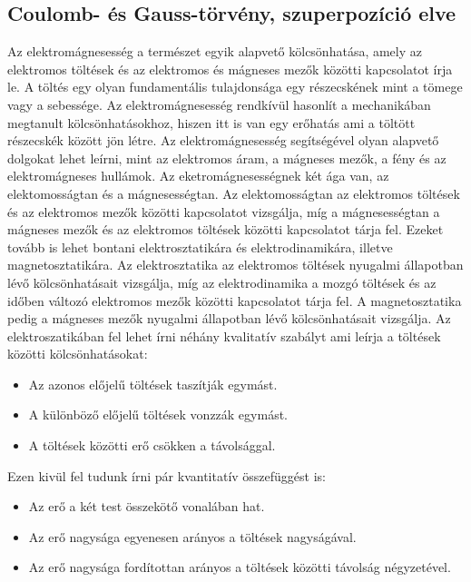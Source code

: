 \documentclass[a4paper,12pt]{article}
\begin{document}
\subsection{Coulomb- és Gauss-törvény, szuperpozíció elve}
Az elektromágnesesség a természet egyik alapvető kölcsönhatása, amely az elektromos töltések és az elektromos és mágneses mezők közötti kapcsolatot írja le.
A töltés egy olyan fundamentális tulajdonsága egy részecskének mint a tömege vagy a sebessége. Az elektromágnesesség rendkívül hasonlít a mechanikában megtanult
kölcsönhatásokhoz, hiszen itt is van egy erőhatás ami a töltött részecskék között jön létre. Az elektromágnesesség segítségével olyan alapvető dolgokat lehet leírni,
mint az elektromos áram, a mágneses mezők, a fény és az elektromágneses hullámok.
\newline
\newline
Az eketromágnesességnek két ága van, az elektomosságtan és a mágnesességtan. Az elektomosságtan az elektromos töltések és az elektromos mezők közötti kapcsolatot vizsgálja,
míg a mágnesességtan a mágneses mezők és az elektromos töltések közötti kapcsolatot tárja fel. Ezeket tovább is lehet bontani elektrosztatikára és elektrodinamikára,
illetve magnetosztatikára. Az elektrosztatika az elektromos töltések nyugalmi állapotban lévő kölcsönhatásait vizsgálja, míg az elektrodinamika a mozgó töltések és az időben változó elektromos mezők közötti kapcsolatot tárja fel.
A magnetosztatika pedig a mágneses mezők nyugalmi állapotban lévő kölcsönhatásait vizsgálja.
\newline
\newline
Az elektroszatikában fel lehet írni néhány kvalitatív szabályt ami leírja a töltések közötti kölcsönhatásokat:
\begin{itemize}
    \item Az azonos előjelű töltések taszítják egymást.
    \item A különböző előjelű töltések vonzzák egymást.
    \item A töltések közötti erő csökken a távolsággal.
\end{itemize}
Ezen kivül fel tudunk írni pár kvantitatív összefüggést is:
\begin{itemize}
    \item Az erő a két test összekötő vonalában hat.
    \item Az erő nagysága egyenesen arányos a töltések nagyságával.
    \item Az erő nagysága fordítottan arányos a töltések közötti távolság négyzetével.
\end{itemize}
\end{document}
